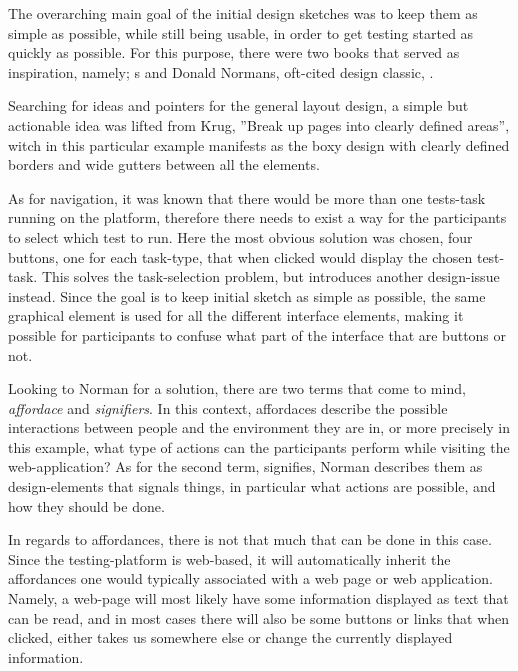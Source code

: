 {	The overarching main goal of the initial design sketches was to keep them as
	simple as possible, while still being usable, in order to get testing started
	as quickly as possible. For this purpose, there were two books that served as
	inspiration, namely; \citeauthor{citeDonMakeMeThink}s
	\cite{citeDonMakeMeThink} and Donald Normans,
	oft-cited design classic,
	\cite{citeTheDesignOfEverydayThings}.

	Searching for ideas and pointers for the general layout design, a simple but
	actionable idea was lifted from Krug, ''Break up pages into clearly defined
	areas'', witch in this particular example manifests as the boxy design with
	clearly defined borders and wide gutters between all the elements.

  As for navigation, it was known that there would be more than one tests-task
  running on the platform, therefore there needs to exist a way for the
  participants to select which test to run. Here the most obvious solution was
  chosen, four buttons, one for each task-type, that when clicked would display
  the chosen test-task. This solves the task-selection problem, but introduces
  another design-issue instead. Since the goal is to keep initial sketch as
  simple as possible, the same graphical element is used for all the different
  interface elements, making it possible for participants to confuse what part
  of the interface that are buttons or not.

  Looking to Norman for a solution, there are two terms that come to mind,
  \textit{affordace} and \textit{signifiers}. In this context, affordaces
  describe the possible interactions between people and the environment they
  are in, or more precisely in this example, what type of actions can
  the participants perform while visiting the web-application? As for the
  second term, signifies, Norman describes them as design-elements that signals
  things, in particular what actions are possible, and how they should be done.

  In regards to affordances, there is not that much that can be done in this
  case. Since the testing-platform is web-based, it will automatically inherit
  the affordances one would typically associated with a web page or web
  application. Namely, a web-page will most likely have some information
  displayed as text that can be read, and in most cases there will also be some
  buttons or links that when clicked, either takes us somewhere else or change
  the currently displayed information.

}
